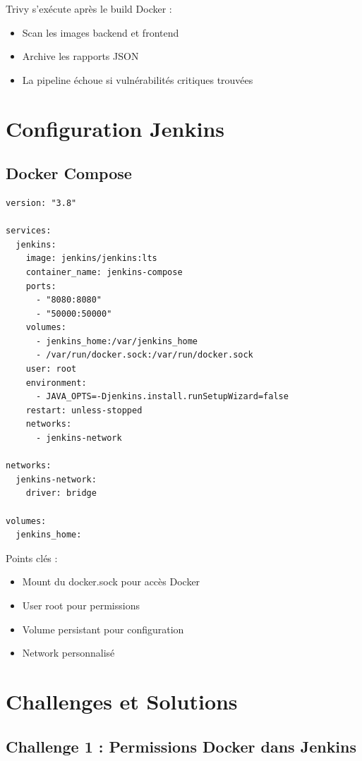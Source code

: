 \documentclass[12pt,a4paper]{report}
\begin{document}
Trivy s'exécute après le build Docker :
\begin{itemize}
    \item Scan les images backend et frontend
    \item Archive les rapports JSON
    \item La pipeline échoue si vulnérabilités critiques trouvées
\end{itemize}

\section{Configuration Jenkins}

\subsection{Docker Compose}

\begin{verbatim}
version: "3.8"

services:
  jenkins:
    image: jenkins/jenkins:lts
    container_name: jenkins-compose
    ports:
      - "8080:8080"
      - "50000:50000"
    volumes:
      - jenkins_home:/var/jenkins_home
      - /var/run/docker.sock:/var/run/docker.sock
    user: root
    environment:
      - JAVA_OPTS=-Djenkins.install.runSetupWizard=false
    restart: unless-stopped
    networks:
      - jenkins-network

networks:
  jenkins-network:
    driver: bridge

volumes:
  jenkins_home:
\end{verbatim}

Points clés :
\begin{itemize}
    \item Mount du docker.sock pour accès Docker
    \item User root pour permissions
    \item Volume persistant pour configuration
    \item Network personnalisé
\end{itemize}

\section{Challenges et Solutions}

\subsection{Challenge 1 : Permissions Docker dans Jenkins}
\end{document}
